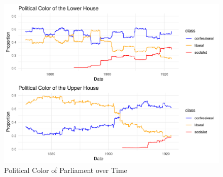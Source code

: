 %
%
\clearpage
\printbibliography

\clearpage






\clearpage

\begin{landscape}

\begin{figure}
    \centering
    \includegraphics[scale=0.80]{figures/step4comp.png}
    \caption{Political Color of Parliament over Time}
    \label{fig:parltime}
\end{figure}

\end{landscape}
\clearpage

